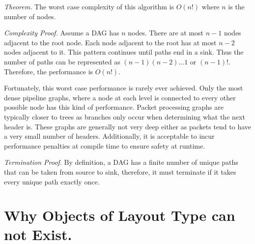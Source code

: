 \textit{Theorem.} The worst case complexity of this algorithm is $O(n!)$ where $n$ is the number of nodes.

\textit{Complexity Proof.}  Assume a DAG has $n$ nodes. There are at most $n-1$ nodes adjacent to the root node. Each node adjacent to the root has at most $n-2$ nodes adjacent to it. This pattern continues until paths end in a sink. Thus the number of paths can be represented as $(n-1)(n-2)...1$ or $(n-1)!$. Therefore, the performance
is $O(n!)$.

Fortunately, this worst case performance is rarely ever achieved. Only the most dense pipeline graphs, where a node at each level is connected to every other possible node has this kind of performance. Packet processing graphs are typically closer to trees as branches only occur when determining what the next header is. These graphs are generally not very deep either as packets tend to have a very small number of headers.
Additionally, it is acceptable to incur performance penalties at compile time
to ensure safety at runtime.

\textit{Termination Proof.} By definition, a DAG has a finite number of unique paths that can be taken from source to sink, therefore, it must terminate if it takes every unique path exactly once.
%
%

\section{Why Objects of Layout Type can not Exist.} \label{guide:no_dst}

